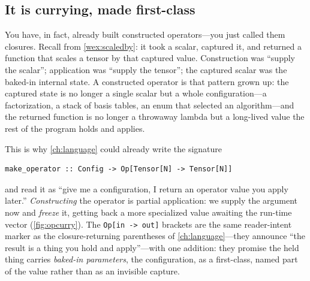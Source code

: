 \subsection{It is currying, made first-class}

You have, in fact, already built constructed operators---you just called them
closures. Recall  from \cref{wex:scaledby}: it took a scalar,
captured it, and returned a function that scales a tensor by that captured value.
Construction was ``supply the scalar''; application was ``supply the tensor''; the
captured scalar was the baked-in internal state. A constructed operator is that
pattern grown up: the captured state is no longer a single scalar but a whole
configuration---a factorization, a stack of basis tables, an enum that selected an
algorithm---and the returned function is no longer a throwaway lambda but a
long-lived value the rest of the program holds and applies.

This is why \cref{ch:language} could already write the signature

\begin{lstlisting}[style=l4style]
make_operator :: Config -> Op[Tensor[N] -> Tensor[N]]
\end{lstlisting}

\noindent and read it as ``give me a configuration, I return an operator value you
apply later.'' \emph{Constructing} the operator is partial application: we supply
the  argument now and \emph{freeze} it, getting back a more specialized
value awaiting the run-time vector (\cref{fig:opcurry}). The
\lstinline[style=l4style]|Op[in -> out]| brackets are the same reader-intent marker
as the closure-returning parentheses of \cref{ch:language}---they announce ``the
result is a thing you hold and apply''---with one addition: they promise the held
thing carries \emph{baked-in parameters}, the configuration, as a first-class,
named part of the value rather than as an invisible capture.

